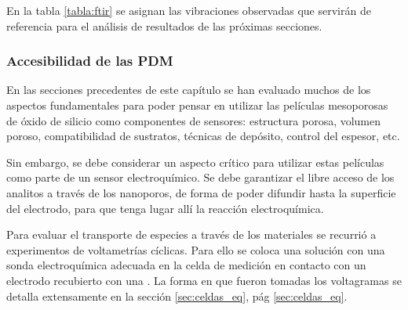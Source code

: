 		  En la tabla \ref{tabla:ftir} se asignan las vibraciones observadas que servirán de referencia para el análisis de resultados de las próximas secciones.

	    \subsubsection{Accesibilidad de las PDM}\label{sec:acc}

			En las secciones precedentes de este capítulo se han evaluado muchos de los aspectos fundamentales para poder pensar en utilizar las películas mesoporosas de óxido de silicio como componentes de sensores: estructura porosa, volumen poroso, compatibilidad de sustratos, técnicas de depósito, control del espesor, etc.\cite{Soler-Illia2002a,Innocenzi2013,walcarius2013}

			Sin embargo, se debe considerar un aspecto crítico para utilizar estas películas como parte de un sensor electroquímico. Se debe garantizar el libre acceso de los analitos a través de los nanoporos, de forma de poder difundir hasta la superficie del electrodo, para que tenga lugar allí la reacción electroquímica.

			Para evaluar el transporte de especies a través de los materiales se recurrió a experimentos de voltametrías cíclicas. Para ello se coloca una solución con una sonda electroquímica adecuada en la celda de medición en contacto con un electrodo recubierto con una \pdm. La forma en que fueron tomadas los voltagramas se detalla extensamente en la sección \ref{sec:celdas_eq}, pág \ref{sec:celdas_eq}. 

